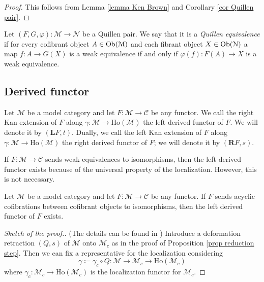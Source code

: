 \begin{refsection}
\begin{proof}
This follows from Lemma \ref{lemma Ken Brown} and Corollary \ref{cor Quillen pair}.
\end{proof}

\begin{defin}
Let $(F,G,\varphi) \colon \mathcal M \to \mathcal N$ be a Quillen pair. We say that it is a \emph{Quillen equivalence} if for every cofibrant object $A \in \operatorname{Ob}(\mathcal M)$ and each fibrant object $X \in \operatorname{Ob}(\mathcal N)$ a map $f \colon A \to G(X)$ is a weak equivalence if and only if $\varphi(f) \colon F(A) \to X$ is a weak equivalence.
\end{defin}



\subsection{Derived functor}

\begin{defin}
Let $\mathcal M$ be a model category and let $F \colon \mathcal M \to \mathcal C$ be any functor. We call the right Kan extension of $F$ along $\gamma \colon \mathcal M \to \text{Ho}(\mathcal M)$ the left derived functor of $F$. We will denote it by $(\mathbf LF,t)$. Dually, we call the left Kan extension of $F$ along $\gamma \colon \mathcal M \to \text{Ho}(\mathcal M)$ the right derived functor of $F$; we will denote it by $(\mathbf RF,s)$.
\end{defin}

\begin{rmk}
If $F \colon \mathcal M \to \mathcal C$ sends weak equivalences to isomorphisms, then the left derived functor exists because of the universal property of the localization. However, this is not necessary. %
\end{rmk}

\begin{thm} \label{thm existence derived functor}
Let $\mathcal M$ be a model category and let $F \colon \mathcal M \to \mathcal C$ be any functor. If $F$ sends acyclic cofibrations between cofibrant objects to isomorphisms, then the left derived functor of $F$ exists.
\end{thm}

\begin{proof}[Sketch of the proof.] (The details can be found in \cite[Theorem 2.2.8]{riehl}) Introduce a deformation retraction $(Q,s)$ of $\mathcal M$ onto $\mathcal M_c$ as in the proof of Proposition \ref{prop reduction step}. Then we can fix a representative for the localization considering
\[
\gamma\coloneqq \gamma_c \circ Q \colon \mathcal M \to \mathcal M_c \to \mathrm{Ho}(\mathcal M_c)
\]
where $\gamma_c \colon \mathcal M_c \to \mathrm{Ho}(\mathcal M_c)$ is the localization functor for $\mathcal M_c$.


\end{proof}
\end{refsection}
